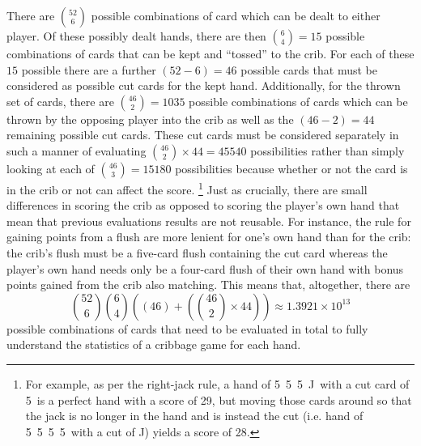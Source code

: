 There are ${52 \choose 6}$ possible combinations of card which can be dealt to
either player.
%
Of these possibly dealt hands, there are then ${6 \choose 4} = 15$ possible
combinations of cards that can be kept and ``tossed'' to the crib.
%
For each of these $15$ possible there are a further $(52-6)=46$ possible cards
that must be considered as possible cut cards for the kept hand.
%
Additionally, for the thrown set of cards,
there are ${46 \choose 2} = 1035$ possible combinations of cards which can be
thrown by the opposing player into the crib as well as the
$(46-2)=44$ remaining possible cut cards.
%
These cut cards must be considered separately in such a manner of
evaluating ${46 \choose 2} \times 44 = 45540$ possibilities rather than
simply looking at each of ${46 \choose 3} = 15180$ possibilities because
whether or not the card is in the crib or not can affect the score.%
\footnote{
	For example, as per the right-jack rule,
	a hand of 5\clubs\ 5\hearts\ 5\spades\ J\diamonds\ 
	with a cut card of 5\diamonds\ is a perfect hand
	with a score of 29,
	but moving those cards around so that the jack is no longer in the hand
	and is instead the cut
	(i.e. hand of 5\clubs\ 5\hearts\ 5\spades\ 5\diamonds\
	with a cut of J\diamonds)
	yields a score of 28.
}
%
Just as crucially, there are small differences in scoring the crib as opposed to
scoring the player's own hand that mean that previous evaluations results are
not reusable.
%
For instance, the rule for gaining points from a flush are more lenient for
one's own hand than for the crib:
the crib's flush must be a five-card flush containing the cut card
whereas the player's own hand needs only be a four-card flush of their own
hand with bonus points gained from the crib also matching.
%
This means that, altogether, there are 
\[
	{52 \choose 6}
	{6 \choose 4}
	\left(
		\left(46\right) +
		\left(
			{46 \choose 2} \times 44
		\right)
	\right)
	\approx
	1.3921 \times {10}^{13}
\]
possible combinations of cards that need to be evaluated in total to fully 
understand the statistics
of a cribbage game for each hand.

